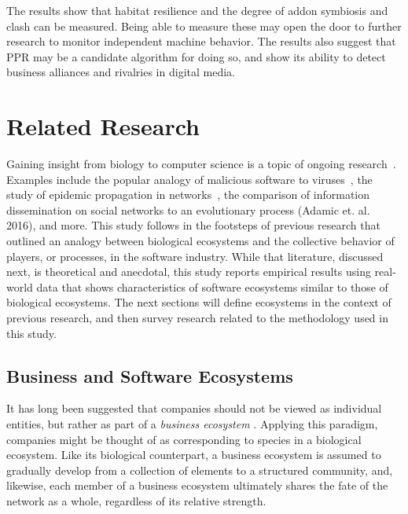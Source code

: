 \documentclass[10pt,letterpaper]{article}
\begin{document}
The results show that habitat resilience and the degree of addon symbiosis and clash can be measured. Being able to measure these may open the door to further research to monitor independent machine behavior. The results also suggest that PPR may be a candidate algorithm for doing so, and show its ability to detect business alliances and rivalries in digital media. 


\section*{Related Research}

Gaining insight from biology to computer science is a topic of ongoing research~\cite{rasmus2015computational}. Examples include the popular analogy of malicious software to viruses~\cite{cohen1987computer}, the study of epidemic propagation in networks~\cite{christosKAIS14}, the comparison of information dissemination on social networks to an evolutionary process (Adamic et. al. 2016), and more. This study follows in the footsteps of previous research that outlined an analogy between biological ecosystems and the collective behavior of players, or processes, in the software industry. While that literature, discussed next, is theoretical and anecdotal, this study reports empirical results using real-world data that shows characteristics of software ecosystems similar to those of biological ecosystems. The next sections will define ecosystems in the context of previous research, and then survey research related to the methodology used in this study.

\subsection*{Business and Software Ecosystems}

It has long been suggested that companies should not be viewed as individual entities, but rather as part of a \textit{business ecosystem} \cite{moore93,iansiti04}. Applying this paradigm, companies might be thought of as corresponding to species in a biological ecosystem. Like its biological counterpart, a business ecosystem is assumed to gradually develop from a collection of elements to a structured community, and, likewise, each member of a business ecosystem ultimately shares the fate of the network as a whole, regardless of its relative strength. 
\end{document}
